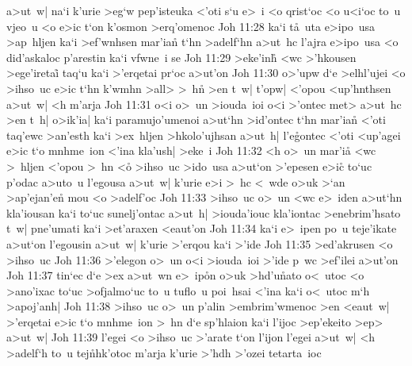 a>ut~w|
na`i
k'urie
>eg`w
pep'isteuka
<'oti
s`u
e>~i
<o
qrist`oc
<o
u<i`oc
to~u
vjeo~u
<o
e>ic
t`on
k'osmon
>erq'omenoc\bibvsend
\vs Joh 11:28
ka`i
t\r{a}~uta
e>ipo~usa
>ap~hljen
ka`i
>ef'wnhsen
mar'ia\r{n}
t`hn
>adelf`hn
a>ut~hc
l'ajra
e>ipo~usa
<o
did'askaloc
p'arestin
ka`i
vfwne~i
se\bibvsend
\vs Joh 11:29
>eke'in\r{h}
<wc
>'hkousen
>ege'iretai\r{}
taq`u
ka`i
>'erqetai
pr`oc
a>ut'on\bibvsend
\vs Joh 11:30
o>'upw
d`e
>elhl'ujei
<o
>ihso~uc
e>ic
t`hn
k'wmhn
>all>
>~h\r{n}
>en
t~w|
t'opw|
<'opou
<up'hnthsen
a>ut~w|
<h
m'arja\bibvsend
\vs Joh 11:31
o<i
o>~un
>iouda~ioi
o<i
>'ontec
met>
a>ut~hc
>en
t~h|
o>ik'ia|
ka`i
paramujo'umenoi
a>ut`hn
>id'ontec
t`hn
mar'ia\r{n}
<'oti
taq'ewc
>an'esth
ka`i
>ex~hljen
>hkolo'ujhsan
a>ut~h|
l'e\r{g}ontec
<'oti
<up'agei
e>ic
t`o
mnhme~ion
<'ina
kla'ush|
>eke~i\bibvsend
\vs Joh 11:32
<h
o>~un
mar'i\r{a}
<wc
>~hljen
<'opou
>~hn
<o\r{}
>ihso~uc
>ido~usa
a>ut`on
>'epesen
e>ic\r{}
to`uc
p'odac
a>uto~u
l'egousa
a>ut~w|
k'urie
e>i
>~hc
<~wde
o>uk
>`an
>ap'ejan'en\r{}
mou
<o
>adelf'oc\bibvsend
\vs Joh 11:33
>ihso~uc
o>~un
<wc
e>~iden
a>ut`hn
kla'iousan
ka`i
to`uc
sunelj'ontac
a>ut~h|
>iouda'iouc
kla'iontac
>enebrim'hsato
t~w|
pne'umati
ka`i
>et'araxen
<eaut'on\bibvsend
\vs Joh 11:34
ka`i
e>~ipen
po~u
teje'ikate
a>ut`on
l'egousin
a>ut~w|
k'urie
>'erqou
ka`i
>'ide\bibvsend
\vs Joh 11:35
>ed'akrusen
<o
>ihso~uc\bibvsend
\vs Joh 11:36
>'elegon
o>~un
o<i
>iouda~ioi
>'ide
p~wc
>ef'ilei
a>ut'on\bibvsend
\vs Joh 11:37
tin`ec
d`e
>ex
a>ut~wn
e>~ip\r{o}n
o>uk
>hd'u\r{n}ato
o<~utoc
<o
>ano'ixac
to`uc
>ofjalmo`uc
to~u
tuflo~u
poi~hsai
<'ina
ka`i
o<~utoc
m`h
>apoj'anh|\bibvsend
\vs Joh 11:38
>ihso~uc
o>~un
p'alin
>embrim'wmenoc
>en
<eaut~w|
>'erqetai
e>ic
t`o
mnhme~ion
>~hn
d`e
sp'hlaion
ka`i
l'ijoc
>ep'ekeito
>ep>
a>ut~w|\bibvsend
\vs Joh 11:39
l'egei
<o
>ihso~uc
>'arate
t`on
l'ijon
l'egei
a>ut~w|
<h
>adelf`h
to~u
tej\r{n}hk'otoc
m'arja
k'urie
>'hdh
>'ozei
tetarta~ioc
